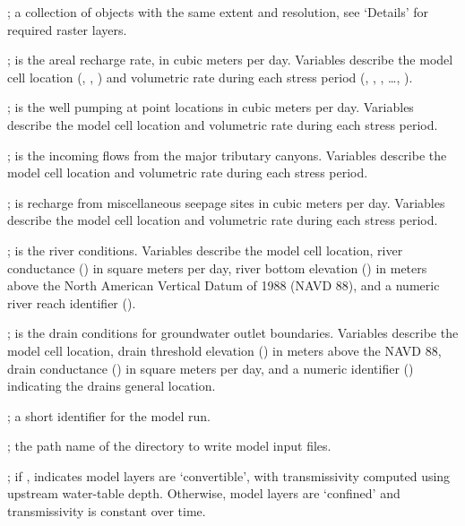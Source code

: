 \documentclass[a4paper]{book}
\begin{document}
%
\begin{Arguments}
\begin{ldescription}
\item[\code{rs.model}] ; a collection of  objects with the same extent and resolution, see `Details' for required raster layers.
\item[\code{rech}] ; is the areal recharge rate, in cubic meters per day.
Variables describe the model cell location (, , ) and volumetric rate during each stress period (, , , \dots, ).
\item[\code{well}] ; is the well pumping at point locations in cubic meters per day.
Variables describe the model cell location and volumetric rate during each stress period.
\item[\code{trib}] ; is the incoming flows from the major tributary canyons.
Variables describe the model cell location and volumetric rate during each stress period.
\item[\code{misc}] ; is recharge from miscellaneous seepage sites in cubic meters per day.
Variables describe the model cell location and volumetric rate during each stress period.
\item[\code{river}] ; is the river conditions.
Variables describe the model cell location, river conductance () in square meters per day, river bottom elevation () in meters above the North American Vertical Datum of 1988 (NAVD 88), and a numeric river reach identifier ().
\item[\code{drain}] ; is the drain conditions for groundwater outlet boundaries.
Variables describe the model cell location, drain threshold elevation () in meters above the NAVD 88, drain conductance () in square meters per day, and a numeric identifier () indicating the drains general location.
\item[\code{id}] ; a short identifier for the model run.
\item[\code{dir.run}] ; the path name of the directory to write model input files.
\item[\code{is.convertible}] ; if , indicates model layers are `convertible', with transmissivity computed using upstream water-table depth.
Otherwise, model layers are `confined' and transmissivity is constant over time.

\end{ldescription}
\end{Arguments}
\end{document}
